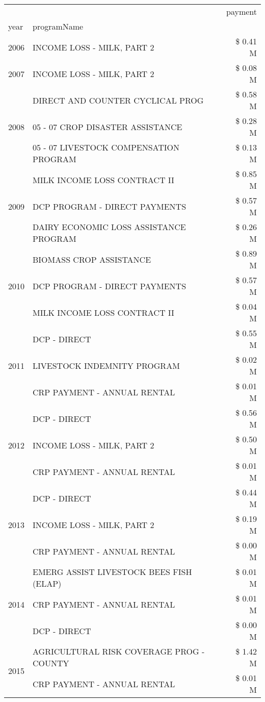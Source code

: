 \begin{tabular}{llr}
\toprule
 &  & payment \\
year & programName &  \\
\midrule
2006 & INCOME LOSS - MILK, PART 2 & \$ 0.41 M \\
\cline{1-3}
2007 & INCOME LOSS - MILK, PART 2 & \$ 0.08 M \\
\cline{1-3}
\multirow[t]{3}{*}{2008} & DIRECT AND COUNTER CYCLICAL PROG & \$ 0.58 M \\
 & 05 - 07 CROP DISASTER ASSISTANCE & \$ 0.28 M \\
 & 05 - 07 LIVESTOCK COMPENSATION PROGRAM & \$ 0.13 M \\
\cline{1-3}
\multirow[t]{3}{*}{2009} & MILK INCOME LOSS CONTRACT II & \$ 0.85 M \\
 & DCP PROGRAM - DIRECT PAYMENTS & \$ 0.57 M \\
 & DAIRY ECONOMIC LOSS ASSISTANCE PROGRAM & \$ 0.26 M \\
\cline{1-3}
\multirow[t]{3}{*}{2010} & BIOMASS CROP ASSISTANCE & \$ 0.89 M \\
 & DCP PROGRAM - DIRECT PAYMENTS & \$ 0.57 M \\
 & MILK INCOME LOSS CONTRACT II & \$ 0.04 M \\
\cline{1-3}
\multirow[t]{3}{*}{2011} & DCP - DIRECT & \$ 0.55 M \\
 & LIVESTOCK INDEMNITY PROGRAM & \$ 0.02 M \\
 & CRP PAYMENT - ANNUAL RENTAL & \$ 0.01 M \\
\cline{1-3}
\multirow[t]{3}{*}{2012} & DCP - DIRECT & \$ 0.56 M \\
 & INCOME LOSS - MILK, PART 2 & \$ 0.50 M \\
 & CRP PAYMENT - ANNUAL RENTAL & \$ 0.01 M \\
\cline{1-3}
\multirow[t]{3}{*}{2013} & DCP - DIRECT & \$ 0.44 M \\
 & INCOME LOSS - MILK, PART 2 & \$ 0.19 M \\
 & CRP PAYMENT - ANNUAL RENTAL & \$ 0.00 M \\
\cline{1-3}
\multirow[t]{3}{*}{2014} & EMERG ASSIST LIVESTOCK BEES FISH (ELAP) & \$ 0.01 M \\
 & CRP PAYMENT - ANNUAL RENTAL & \$ 0.01 M \\
 & DCP - DIRECT & \$ 0.00 M \\
\cline{1-3}
\multirow[t]{3}{*}{2015} & AGRICULTURAL RISK COVERAGE PROG - COUNTY & \$ 1.42 M \\
 & CRP PAYMENT - ANNUAL RENTAL & \$ 0.01 M \\

\end{tabular}
